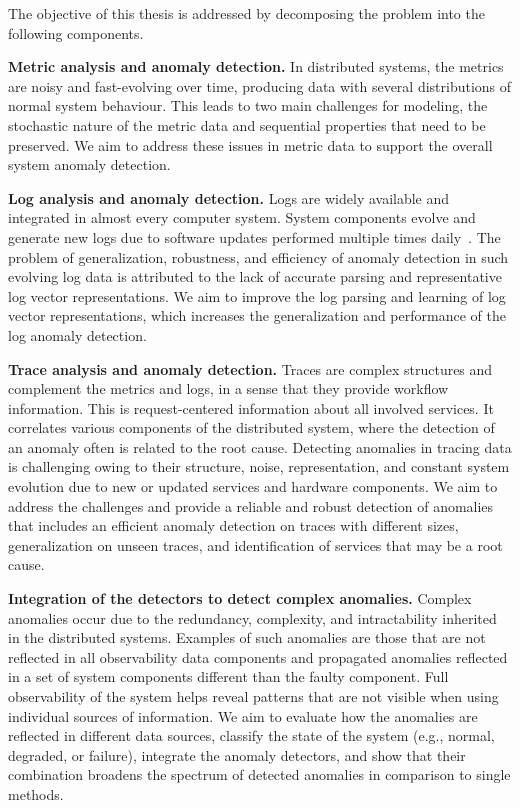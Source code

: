 The objective of this thesis is addressed by decomposing the problem into the following components.

\textbf{Metric analysis and anomaly detection.}
In distributed systems, the metrics are noisy and fast-evolving over time, producing data with several distributions of normal system behaviour. This leads to two main challenges for modeling, the stochastic nature of the metric data and sequential properties that need to be preserved. We aim to address these issues in metric data to support the overall system anomaly detection.

\textbf{Log analysis and anomaly detection.} Logs are widely available and integrated in almost every computer system. System components evolve and generate new logs due to software updates performed multiple times daily~\cite{shahin2017continuous}. The problem of generalization, robustness, and efficiency of anomaly detection in such evolving log data is attributed to the lack of accurate parsing and representative log vector representations. We aim to improve the log parsing and learning of log vector representations, which increases the generalization and performance of the log anomaly detection.

\newpage

\textbf{Trace analysis and anomaly detection.} Traces are complex structures and complement the metrics and logs, in a sense that they provide workflow information. This is request-centered information about all involved services. It correlates various components of the distributed system, where the detection of an anomaly often is related to the root cause. Detecting anomalies in tracing data is challenging owing to their structure, noise, representation, and constant system evolution due to new or updated services and hardware components. We aim to address the challenges and provide a reliable and robust detection of anomalies that includes an efficient anomaly detection on traces with different sizes, generalization on unseen traces, and identification of services that may be a root cause.

\textbf{Integration of the detectors to detect complex anomalies.}  Complex anomalies occur due to the redundancy, complexity, and intractability inherited in the distributed systems. Examples of such anomalies are those that are not reflected in all observability data components and propagated anomalies reflected in a set of system components different than the faulty component. Full observability of the system helps reveal patterns that are not visible when using individual sources of information. We aim to evaluate how the anomalies are reflected in different data sources, classify the state of the system (e.g., normal, degraded, or failure), integrate the anomaly detectors, and show that their combination broadens the spectrum of detected anomalies in comparison to single methods.

